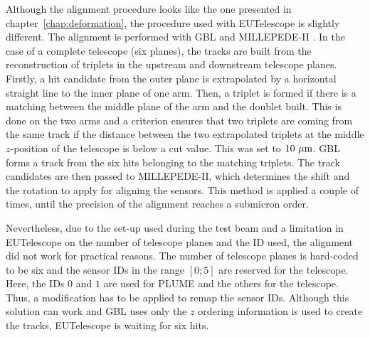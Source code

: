     Although the alignment procedure looks like the one presented in chapter~\ref{chap:deformation}, the procedure used with EUTelescope is slightly different.
    The alignment is performed with \gls{GBL} and MILLEPEDE-II \cite{MPII}.
    In the case of a complete telescope (six planes), the tracks are built from the reconstruction of triplets in the upstream and downstream telescope planes.
    Firstly, a hit candidate from the outer plane is extrapolated by a horizontal straight line to the inner plane of one arm.
    Then, a triplet is formed if there is a matching between the middle plane of the arm and the doublet built.
    This is done on the two arms and a criterion ensures that two triplets are coming from the same track if the distance between the two extrapolated triplets at the middle $z$-position of the telescope is below a cut value.
    This was set to $10~\rm{\mu m}$.
    \gls{GBL} forms a track from the six hits belonging to the matching triplets.
    The track candidates are then passed to MILLEPEDE-II, which determines the shift and the rotation to apply for aligning the sensors.
    This method is applied a couple of times, until the precision of the alignment reaches a submicron order.

    Nevertheless, due to the set-up used during the test beam and a limitation in EUTelescope on the number of telescope planes and the ID used, the alignment did not work for practical reasons.
    The number of telescope planes is hard-coded to be six and the sensor IDs in the range $[0; 5]$ are reserved for the telescope. 
    Here, the IDs $0$ and $1$ are used for \gls{PLUME} and the others for the telescope.
    Thus, a modification has to be applied to remap the sensor IDs. 
    Although this solution can work and \gls{GBL} uses only the $z$ ordering information is used to create the tracks, EUTelescope is waiting for six hits.
      

